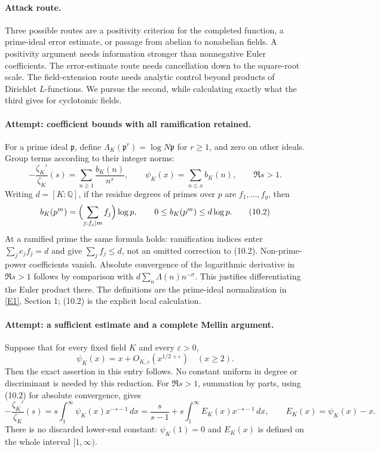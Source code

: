 \documentclass[11pt,a4paper]{article}
\newcommand{\Q}{\mathbb{Q}}
\newcommand{\eref}[2]{\hyperlink{extra:#1:#2}{[E#2]}}
\begin{document}
\paragraph{Attack route.}
Three possible routes are a positivity criterion for the completed
function, a prime-ideal error estimate, or passage from abelian to
nonabelian fields. A positivity argument needs information stronger
than nonnegative Euler coefficients. The error-estimate route needs
cancellation down to the square-root scale. The field-extension route
needs analytic control beyond products of Dirichlet $L$-functions.
We pursue the second, while calculating exactly what the third gives
for cyclotomic fields.

\paragraph{Attempt: coefficient bounds with all ramification retained.}
For a prime ideal $\mathfrak p$, define
$\Lambda_K(\mathfrak p^r)=\log N\mathfrak p$ for $r\geq1$, and
zero on other ideals. Group terms according to their integer norms:
\[
 -\frac{\zeta_K'}{\zeta_K}(s)
 =\sum_{n\geq1}\frac{b_K(n)}{n^s},\qquad
 \psi_K(x)=\sum_{n\leq x}b_K(n),\qquad \Re s>1. \tag{10.1}
\]
Writing $d=[K:\Q]$, if the residue degrees of primes over $p$ are
$f_1,\ldots,f_g$, then
\[
 b_K(p^m)=\Bigl(\sum_{j:f_j\mid m}f_j\Bigr)\log p,
 \qquad 0\leq b_K(p^m)\leq d\log p. \tag{10.2}
\]
At a ramified prime the same formula holds: ramification indices enter
$\sum_j e_jf_j=d$ and give $\sum_jf_j\leq d$, not an omitted correction
to (10.2). Non-prime-power coefficients vanish. Absolute convergence of
the logarithmic derivative in $\Re s>1$ follows by comparison with
$d\sum_n\Lambda(n)n^{-\sigma}$. This justifies differentiating the
Euler product there. The definitions are the prime-ideal normalization
in \eref{statement}{1}, Section 1; (10.2) is the explicit local calculation.

\paragraph{Attempt: a sufficient estimate and a complete Mellin argument.}
Suppose that for every fixed field $K$ and every $\varepsilon>0$,
\[
 \psi_K(x)=x+O_{K,\varepsilon}(x^{1/2+\varepsilon})
 \quad(x\geq2). \tag{10.3}
\]
Then the exact assertion in this entry follows. No constant uniform
in degree or discriminant is needed by this reduction.
For $\Re s>1$, summation by parts, using (10.2) for absolute convergence,
gives
\[
 -\frac{\zeta_K'}{\zeta_K}(s)
 =s\int_1^\infty\psi_K(x)x^{-s-1}\,dx
 =\frac{s}{s-1}+s\int_1^\infty E_K(x)x^{-s-1}\,dx,
 \qquad E_K(x)=\psi_K(x)-x. \tag{10.4}
\]
There is no discarded lower-end constant: $\psi_K(1)=0$ and
$E_K(x)$ is defined on the whole interval $[1,\infty)$.
\end{document}
